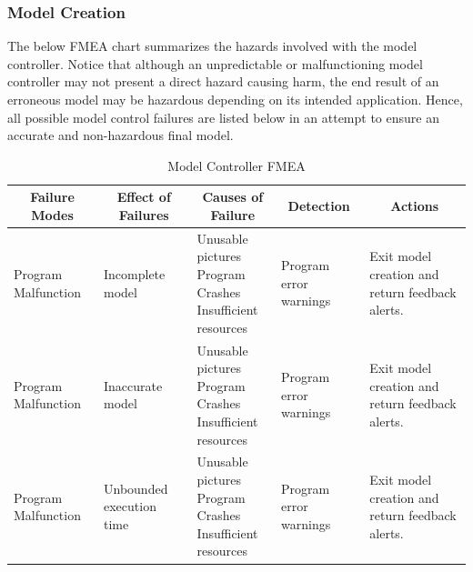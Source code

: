 \documentclass[10pt,letterpaper]{article}
\newcommand{\fmeaheader}{\multicolumn{1}{c}{\textbf{Failure Modes}} & \multicolumn{1}{c}{\textbf{Effect of Failures}} & \multicolumn{1}{c}{\textbf{Causes of Failure}} & \multicolumn{1}{c}{\textbf{Detection}} & \multicolumn{1}{c}{\textbf{Actions}}}
\begin{document}
\newpage 

\subsubsection{Model Creation}
The below FMEA chart summarizes the hazards involved with the model controller. Notice that although an unpredictable or malfunctioning model controller may not present a direct hazard causing harm, the end result of an erroneous model may be hazardous depending on its intended application. Hence, all possible model control failures are listed below in an attempt to ensure an accurate and non-hazardous final model. 
\begin{table}[H]
\footnotesize  
	\begin{adjustwidth}{-1.8in}{-1.8in}  
      \begin{center}
          \begin{tabular}{|p{3cm}p{3cm}p{3cm}p{3cm}p{3cm}|}
              \fmeaheader \\ \hline
              
              Program Malfunction & 
              Incomplete model & 
              \parbox[t]{3cm}{Unusable pictures \\ Program Crashes \\ Insufficient resources} & 
              Program error warnings & 
              Exit model creation and return feedback alerts. \\ \hline  
              
              Program Malfunction & 
              Inaccurate model & 
              \parbox[t]{3cm}{Unusable pictures \\ Program Crashes \\ Insufficient resources} & 
              Program error warnings & 
              Exit model creation and return feedback alerts. \\ \hline  
              
              Program Malfunction & 
              Unbounded execution time & 
              \parbox[t]{3cm}{Unusable pictures \\ Program Crashes \\ Insufficient resources} & 
              Program error warnings & 
              Exit model creation and return feedback alerts. \\ \hline  
              
          \end{tabular}
      \end{center}
      \caption[Model Controller FMEA]{Model Controller FMEA}
    \end{adjustwidth}
\end{table}
\end{document}
